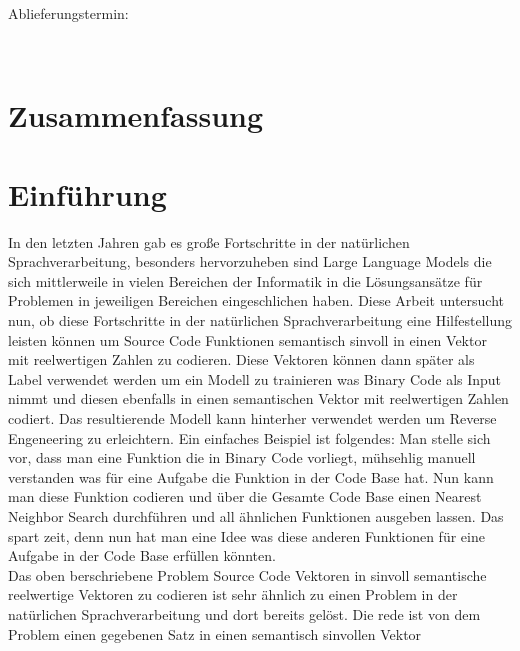 \documentclass[12pt,letterpaper]{article}
\begin{document}
\begin{center}
\begin{large}
Ablieferungstermin: \date{\today} \\
\end{large}
\end{center}

\vspace{1,5cm}

\newpage
\tableofcontents
\newpage

\setcounter{page}{1}
\pagestyle{fancy}
\fancyhf{}
\fancyhead[R]{\thepage}
\renewcommand{\headrulewidth}{0pt} %

\section*{Zusammenfassung}
\section{Einführung}
In den letzten Jahren gab es große Fortschritte in der natürlichen
Sprachverarbeitung, besonders hervorzuheben sind Large Language Models
die sich mittlerweile in vielen Bereichen der Informatik in die Lösungsansätze
für Problemen in jeweiligen Bereichen eingeschlichen haben. Diese Arbeit
untersucht nun, ob diese Fortschritte in der natürlichen Sprachverarbeitung
eine Hilfestellung leisten können um Source Code Funktionen semantisch sinvoll
in einen Vektor mit reelwertigen Zahlen zu codieren. Diese Vektoren können dann
später als Label verwendet werden um ein Modell zu trainieren was Binary Code 
als Input nimmt und diesen ebenfalls in einen semantischen Vektor mit reelwertigen
Zahlen codiert. Das resultierende Modell kann hinterher verwendet werden um Reverse 
Engeneering zu erleichtern. Ein einfaches Beispiel ist folgendes: Man stelle
sich vor, dass man eine Funktion die in Binary Code vorliegt, mühsehlig manuell
verstanden was für eine Aufgabe die Funktion in der Code Base hat. Nun kann man
diese Funktion codieren und über die Gesamte Code Base einen Nearest Neighbor
Search durchführen und all ähnlichen Funktionen ausgeben lassen.
Das spart zeit, denn nun hat man eine Idee was diese anderen
Funktionen für eine Aufgabe in der Code Base erfüllen könnten.\\
Das oben berschriebene Problem Source Code Vektoren in sinvoll semantische 
reelwertige Vektoren zu codieren ist sehr ähnlich zu einen Problem 
in der natürlichen Sprachverarbeitung und dort bereits gelöst. Die rede ist
von dem Problem einen gegebenen Satz in einen semantisch sinvollen Vektor
\end{document}
